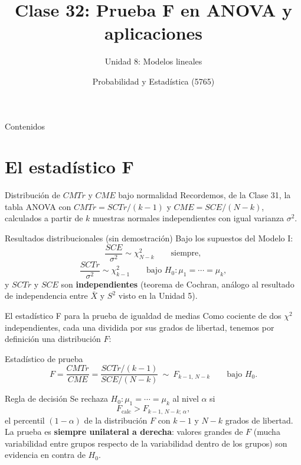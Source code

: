 \documentclass[aspectratio=169,11pt]{beamer}
\title[Prob. y Estadística]{Clase 32: Prueba F en ANOVA y aplicaciones}
\subtitle{Unidad 8: Modelos lineales}
\institute[UNS]{Universidad Nacional del Sur \\ Departamento de Matemática}
\author{Probabilidad y Estadística (5765)}
\date{}
\begin{document}
\begin{frame}
\titlepage
\end{frame}

\begin{frame}{Contenidos}
\tableofcontents
\end{frame}

\section{El estadístico F}

\begin{frame}{Distribución de $CMTr$ y $CME$ bajo normalidad}
Recordemos, de la Clase 31, la tabla ANOVA con $CMTr=SCTr/(k-1)$ y $CME=SCE/(N-k)$, calculados a partir de $k$ muestras normales independientes con igual varianza $\sigma^2$.

\begin{block}{Resultados distribucionales (sin demostración)}
Bajo los supuestos del Modelo I:
\[
\frac{SCE}{\sigma^2} \sim \chi^2_{N-k} \qquad \text{siempre},
\]
\[
\frac{SCTr}{\sigma^2} \sim \chi^2_{k-1} \qquad \text{bajo } H_0:\mu_1=\cdots=\mu_k,
\]
y $SCTr$ y $SCE$ son \textbf{independientes} (teorema de Cochran, análogo al resultado de independencia entre $\bar X$ y $S^2$ visto en la Unidad 5).
\end{block}
\end{frame}

\begin{frame}{El estadístico F para la prueba de igualdad de medias}
Como cociente de dos $\chi^2$ independientes, cada una dividida por sus grados de libertad, tenemos por definición una distribución $F$:

\begin{alertblock}{Estadístico de prueba}
\[
F = \frac{CMTr}{CME} = \frac{SCTr/(k-1)}{SCE/(N-k)} \ \sim\ F_{k-1,\,N-k} \qquad \text{bajo } H_0.
\]
\end{alertblock}

\begin{block}{Regla de decisión}
Se rechaza $H_0:\mu_1=\cdots=\mu_k$ al nivel $\alpha$ si
\[
F_{\text{calc}} > F_{k-1,\,N-k;\,\alpha},
\]
el percentil $(1-\alpha)$ de la distribución $F$ con $k-1$ y $N-k$ grados de libertad. La prueba es \textbf{siempre unilateral a derecha}: valores grandes de $F$ (mucha variabilidad entre grupos respecto de la variabilidad dentro de los grupos) son evidencia en contra de $H_0$.
\end{block}
\end{frame}
\end{document}
